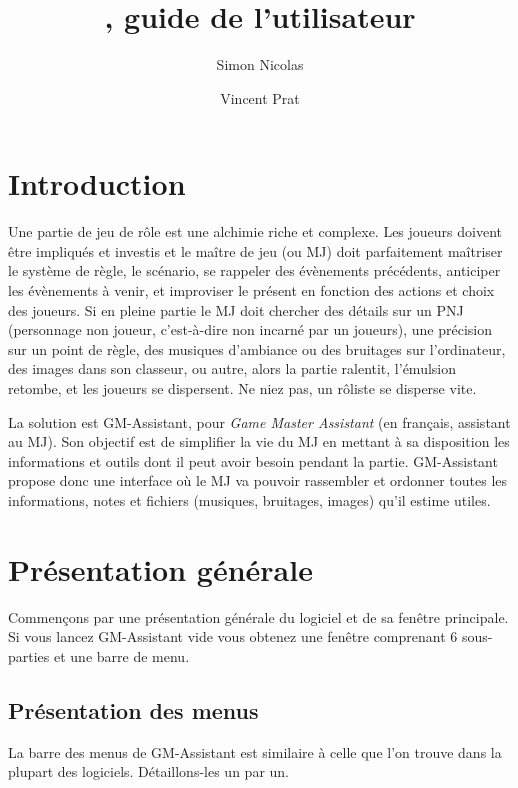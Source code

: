 \documentclass[a4paper,12pt]{article}
\title{\GMA \versionnumber, guide de l'utilisateur}
\author{Simon Nicolas \and Vincent Prat}
\newcommand*{\GMA}{GM-Assistant\xspace}
\begin{document}
\maketitle

\tableofcontents

\section{Introduction}
Une partie de jeu de rôle est une alchimie riche et complexe.
Les joueurs doivent être impliqués et investis et le maître de jeu (ou MJ) doit parfaitement maîtriser le système de règle, le scénario, se rappeler des évènements précédents, anticiper les évènements à venir, et improviser le présent en fonction des actions et choix des joueurs.
Si en pleine partie le MJ doit chercher des détails sur un PNJ (personnage non joueur, c'est-à-dire non incarné par un joueurs), une précision sur un point de règle, des musiques d'ambiance ou des bruitages sur l'ordinateur, des images dans son classeur, ou autre, alors la partie ralentit, l'émulsion retombe, et les joueurs se dispersent.
Ne niez pas, un rôliste se disperse vite.

La solution est \GMA, pour \emph{Game Master Assistant} (en français, assistant au MJ).
Son objectif est de simplifier la vie du MJ en mettant à sa disposition les informations et outils dont il peut avoir besoin pendant la partie.
\GMA propose donc une interface où le MJ va pouvoir rassembler et ordonner toutes les informations, notes et fichiers (musiques, bruitages, images) qu'il estime utiles.

\section{Présentation générale}
Commençons par une présentation générale du logiciel et de sa fenêtre principale.
Si vous lancez \GMA vide vous obtenez une fenêtre comprenant 6 sous-parties et une barre de menu.
\subsection{Présentation des menus}\label{menu}
La barre des menus de \GMA est similaire à celle que l'on trouve dans la plupart des logiciels. Détaillons-les un par un.
\end{document}
